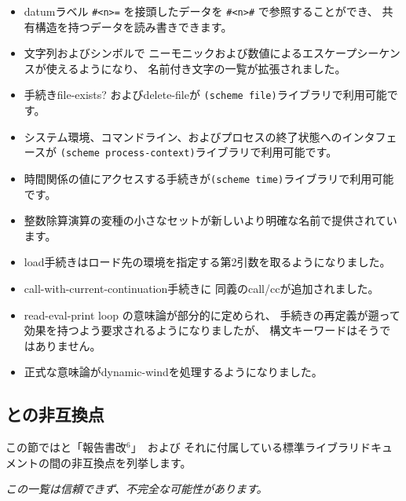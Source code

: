\begin{itemize}
\item datumラベル {\tt \#<n>=} を接頭したデータを {\tt \#<n>\#} で参照することができ、
共有構造を持つデータを読み書きできます。

\item 文字列およびシンボルで
ニーモニックおよび数値によるエスケープシーケンスが使えるようになり、
名前付き文字の一覧が拡張されました。

\item 手続き{\cf file-exists?} および{\cf delete-file}が
{\tt (scheme file)}ライブラリで利用可能です。

\item システム環境、コマンドライン、およびプロセスの終了状態へのインタフェースが
{\tt (scheme process-\+context)}ライブラリで利用可能です。

\item 時間関係の値にアクセスする手続きが{\tt (scheme time)}ライブラリで利用可能です。

\item 整数除算演算の変種の小さなセットが新しいより明確な名前で提供されています。

\item {\cf load}手続きはロード先の環境を指定する第2引数を取るようになりました。

\item {\cf call-with-current-continuation}手続きに
同義の{\cf call/cc}が追加されました。

\item read-eval-print loop の意味論が部分的に定められ、
手続きの再定義が遡って効果を持つよう要求されるようになりましたが、
構文キーワードはそうではありません。

\item 正式な意味論が{\cf dynamic-wind}を処理するようになりました。
\end{itemize}

\subsection*{\rsixrs{}との非互換点}
この節では\rsevenrs{}と「報告書改$^6$」~\cite{R6RS}および
それに付属している標準ライブラリドキュメントの間の非互換点を列挙します。

{\em この一覧は信頼できず、不完全な可能性があります。}

